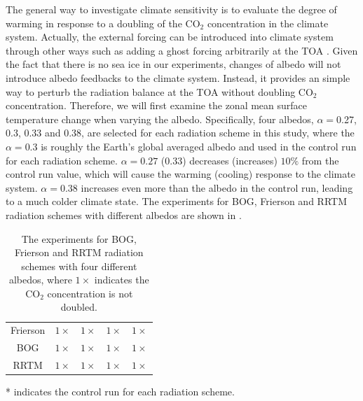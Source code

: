 The general way to investigate climate sensitivity is to evaluate the degree of warming in response to a doubling of the CO$_2$ concentration in the climate system. Actually, the external forcing can be introduced into climate system through other ways such as adding a ghost forcing  arbitrarily at the TOA \citep{Hansen1997,Alexeev2005}. Given the fact that there is no sea ice in our experiments, changes of albedo will not introduce albedo feedbacks to the climate system. Instead, it provides an simple way to perturb the radiation balance at the TOA without doubling CO$_2$ concentration. Therefore, we will first examine the zonal mean surface temperature change when varying the albedo. Specifically, four albedos, $\alpha=$0.27, 0.3, 0.33 and 0.38, are selected for each radiation scheme in this study, where the $\alpha = 0.3$ is roughly the Earth's global averaged albedo and used in the control run for each radiation scheme. $\alpha=0.27$ (0.33) decreases (increases) $10\%$ from the control run value, which will cause the warming (cooling) response to the climate system. $\alpha=0.38$ increases even more than the albedo in the control run, leading to a much colder climate state. The experiments for BOG, Frierson and RRTM radiation schemes with different albedos are shown in .

\begin{table}[ht]
	\centering
	\caption{The experiments for BOG, Frierson and RRTM radiation schemes with four different albedos, where $1\times$ indicates the CO$_2$ concentration is not doubled.} %
	\vspace{0.5em}
	\renewcommand{\arraystretch}{1.3}
	\small
	\begin{threeparttable}
	\begin{tabular}{c|*{4}{c}}
		\toprule
		\diagbox{Scheme}{Albedo} &\makebox[3em]{0.38}&\makebox[3em]{0.33}&\makebox[3em]{0.3\tnote{*}}
		&\makebox[3em]{0.27}\\
	    \midrule
		Frierson & $1\times$ & $1\times$ & $1\times$ & $1\times$ \\ 
		BOG &  $1\times$ & $1\times$ & $1\times$& $1\times$ \\
		RRTM & $1\times$ & $1\times$ & $1\times$ & $1\times$ \\
		\bottomrule
	\end{tabular}%
	\begin{tablenotes}
      \item[*] indicates the control run for each radiation scheme.
     \end{tablenotes}
	\end{threeparttable}
	\label{tab:exp_table}
\end{table}

